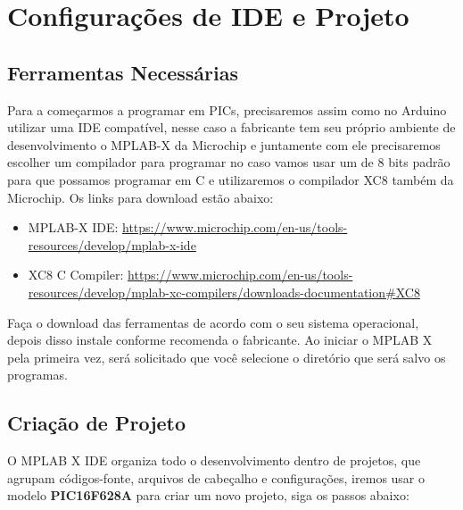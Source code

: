 \documentclass[12pt,a4paper]{book}
\begin{document}
\chapter{Configurações de IDE e Projeto}
\section{Ferramentas Necessárias}
Para a começarmos a programar em PICs, precisaremos assim como no Arduino utilizar uma IDE compatível, nesse caso a fabricante tem seu próprio ambiente de desenvolvimento o MPLAB-X da Microchip e juntamente com ele precisaremos escolher um compilador para programar no caso vamos usar um de 8 bits padrão para que possamos programar em C e utilizaremos o compilador XC8 também da Microchip. Os links para download estão abaixo:
\begin{itemize}
  \item MPLAB-X IDE: \url{https://www.microchip.com/en-us/tools-resources/develop/mplab-x-ide}
  \item XC8 C Compiler: \url{https://www.microchip.com/en-us/tools-resources/develop/mplab-xc-compilers/downloads-documentation#XC8}
\end{itemize}
Faça o download das ferramentas de acordo com o seu sistema operacional, depois disso instale conforme recomenda o fabricante.
Ao iniciar o MPLAB X pela primeira vez, será solicitado que você selecione o diretório que será salvo os programas.

\section{Criação de Projeto}
O MPLAB X IDE organiza todo o desenvolvimento dentro de projetos, que agrupam códigos-fonte, arquivos de cabeçalho e configurações, iremos usar o modelo \textbf{PIC16F628A} para criar um novo projeto, siga os passos abaixo:
\end{document}
